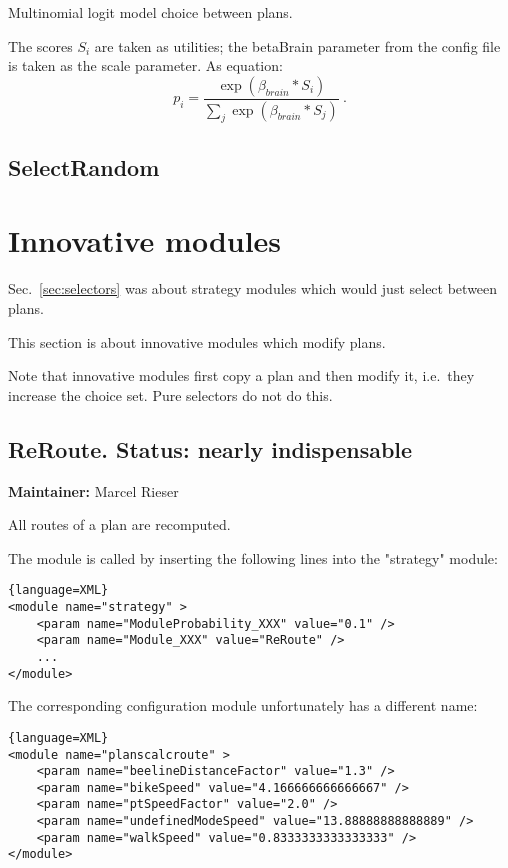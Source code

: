 Multinomial logit model choice between plans.

The scores $S_i$ are taken as utilities; the betaBrain parameter from the  config file is taken as the scale parameter. As equation:
\[
p_i = \frac{\exp( \beta_{brain} * S_i)}{\sum_j \exp( \beta_{brain} * S_j )} \ .
\]

\subsection{SelectRandom}

\vfill\eject
\section{Innovative modules}

Sec.~\ref{sec:selectors} was about strategy modules which would just select between plans.

This section is about innovative modules which modify plans.

Note that innovative modules first copy a plan and then modify it, i.e.\ they increase the choice set.  Pure selectors do not do this.

\subsection{ReRoute.  Status: nearly indispensable}

\textbf{Maintainer:} Marcel Rieser

All routes of a plan are recomputed.

The module is called by inserting the following lines into the "strategy" module:
\begin{lstlisting}{language=XML}
<module name="strategy" >
    <param name="ModuleProbability_XXX" value="0.1" />
    <param name="Module_XXX" value="ReRoute" />
    ...
</module>
\end{lstlisting}


The corresponding configuration module unfortunately has a different name:
\begin{lstlisting}{language=XML}
<module name="planscalcroute" >
    <param name="beelineDistanceFactor" value="1.3" />
    <param name="bikeSpeed" value="4.166666666666667" />
    <param name="ptSpeedFactor" value="2.0" />
    <param name="undefinedModeSpeed" value="13.88888888888889" />
    <param name="walkSpeed" value="0.8333333333333333" />
</module>
\end{lstlisting}

